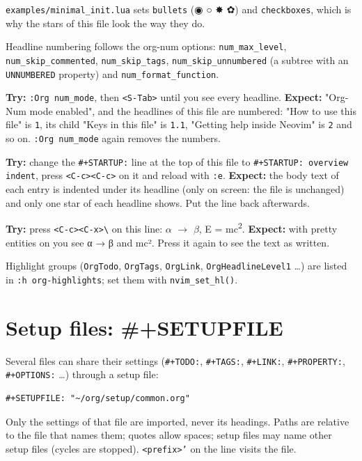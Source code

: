 \texttt{examples/minimal\_init.lua} sets \texttt{bullets} (◉ ○ ✸ ✿) and \texttt{checkboxes},
which is why the stars of this file look the way they do.

Headline numbering follows the org-num options: \texttt{num\_max\_level},
\texttt{num\_skip\_commented}, \texttt{num\_skip\_tags}, \texttt{num\_skip\_unnumbered} (a subtree
with an \texttt{UNNUMBERED} property) and \texttt{num\_format\_function}.

\textbf{Try:} \texttt{:Org num\_mode}, then \texttt{<S-Tab>} until you see every headline.
\textbf{Expect:} "Org-Num mode enabled", and the headlines of this file are
numbered: "How to use this file" is \texttt{1}, its child "Keys in this file" is
\texttt{1.1}, "Getting help inside Neovim" is \texttt{2} and so on. \texttt{:Org num\_mode}
again removes the numbers.

\textbf{Try:} change the \texttt{\#+STARTUP:} line at the top of this file to
\texttt{\#+STARTUP: overview indent}, press \texttt{<C-c><C-c>} on it and reload with
\texttt{:e}.
\textbf{Expect:} the body text of each entry is indented under its headline
(only on screen: the file is unchanged) and only one star of each
headline shows. Put the line back afterwards.

\textbf{Try:} press \texttt{<C-c><C-x>\textbackslash{}} on this line: \(\alpha\) \(\to\) \(\beta\), E = mc\textsuperscript{2}.
\textbf{Expect:} with pretty entities on you see α → β and mc². Press it again
to see the text as written.

Highlight groups (\texttt{OrgTodo}, \texttt{OrgTags}, \texttt{OrgLink}, \texttt{OrgHeadlineLevel1}
\ldots{}) are listed in \texttt{:h org-highlights}; set them with \texttt{nvim\_set\_hl()}.
\section{Setup files: \#+SETUPFILE}
\label{sec:org652c872}
Several files can share their settings (\texttt{\#+TODO:}, \texttt{\#+TAGS:}, \texttt{\#+LINK:},
\texttt{\#+PROPERTY:}, \texttt{\#+OPTIONS:} \ldots{}) through a setup file:

\begin{verbatim}
#+SETUPFILE: "~/org/setup/common.org"
\end{verbatim}

Only the settings of that file are imported, never its headings. Paths
are relative to the file that names them; quotes allow spaces; setup
files may name other setup files (cycles are stopped). \texttt{<prefix>'} on
the line visits the file.

